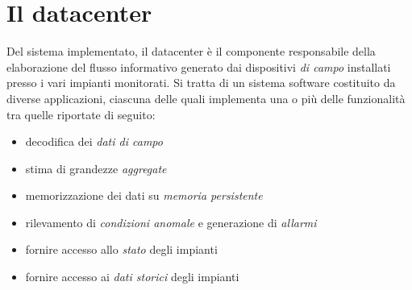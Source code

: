 \clearpage{\pagestyle{empty}\cleardoublepage}
\chapter{Il datacenter}\label{sec:datacenter}
%
Del sistema implementato, il datacenter \`e il componente responsabile della elaborazione 
del flusso informativo generato dai dispositivi \emph{di campo} installati 
presso i vari impianti monitorati.
%
Si tratta di un sistema software costituito da diverse applicazioni, ciascuna 
delle quali implementa una o pi\`u delle funzionalit\`a tra quelle riportate di seguito:
%
\begin{itemize}
  \item decodifica dei \emph{dati di campo}
  \item stima di grandezze \emph{aggregate}
  \item memorizzazione dei dati su \emph{memoria persistente}
  \item rilevamento di \emph{condizioni anomale} e generazione di \emph{allarmi}
  \item fornire accesso allo \emph{stato} degli impianti
  \item fornire accesso ai \emph{dati storici} degli impianti
\end{itemize}
%

